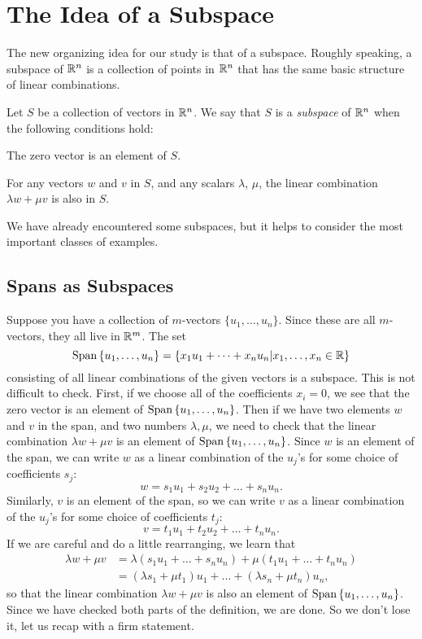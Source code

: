 \documentclass[00-livre-main.tex]{subfiles}
\begin{document}
\section*{The Idea of a Subspace}

The new organizing idea for our study is that of a subspace. Roughly speaking, a subspace of $\mathbb{R}^n$ is a collection of points in $\mathbb{R}^n$ that has the same basic structure of linear combinations.

\begin{definition} Let $S$ be a collection of vectors in $\mathbb{R}^n$. We say that $S$ is a 
\emph{subspace} of $\mathbb{R}^n$ when the following conditions hold:
\begin{compactitem}
\item The zero vector is an element of $S$.
\item For any vectors $w$ and $v$ in $S$, and any scalars $\lambda$, $\mu$, the linear combination $\lambda w + \mu v$ is also in $S$.
\end{compactitem}
\end{definition}

We have already encountered some subspaces, but it helps to consider the most important classes of examples.

\subsection*{Spans as Subspaces}

Suppose you have a collection of $m$-vectors $\{ u_1, \ldots, u_n \}$. Since these are all $m$-vectors, they all live in $\mathbb{R}^m$. The set 
\[
\mathrm{Span}\left\{ u_1, \ldots, u_n \right\} = \left\{ x_1 u_1 + \dots + x_n u_n \middle| x_1, \ldots, x_n \in \mathbb{R}\right\}
\]
consisting of all linear combinations of the given vectors is a subspace. This is not difficult to check. First, if we choose all of the coefficients $x_i=0$, we see that 
the zero vector is an element of $\mathrm{Span}\left\{ u_1,\ldots, u_n \right\}$. Then if we have two elements $w$ and $v$ in the span, and two numbers $\lambda, \mu$, we need to check that the linear combination $\lambda w + \mu v$ is an element of $\mathrm{Span}\left\{ u_1, \ldots, u_n \right\}$. Since $w$ is an element of the span, we can write $w$ as a linear combination of the $u_j$'s for some choice of coefficients $s_j$:
\[
w = s_1 u_1 + s_2 u_2 + \dots + s_n u_n.
\]
Similarly, $v$ is an element of the span, so we can write $v$ as a linear combination of the $u_j$'s for some choice of coefficients $t_j$:
\[
v = t_1 u_1 + t_2 u_2 + \dots + t_n u_n.
\]
If we are careful and do a little rearranging, we learn that
\[
\begin{split}
\lambda w + \mu v & = \lambda \left( s_1 u_1 + \dots + s_n u_n \right) + \mu \left( t_1 u_1 + \dots + t_n u_n \right) \\
& = \left( \lambda s_1 + \mu t_1 \right) u_1 + \dots + \left( \lambda s_n + \mu t_n \right) u_n,
\end{split}
\]
so that the linear combination $\lambda w + \mu v$ is also an element of $\mathrm{Span}\left\{ u_1,\ldots, u_n \right\}$. Since we have checked both parts of the definition, we are done.
So we don't lose it, let us recap with a firm statement.
\end{document}
